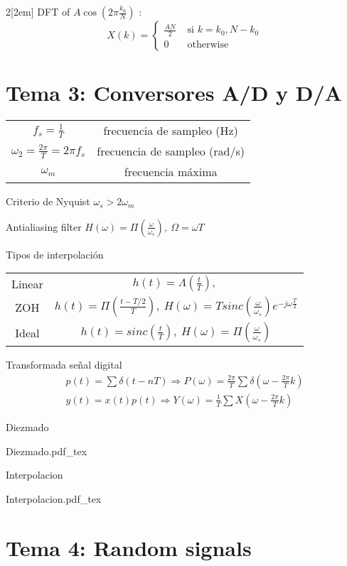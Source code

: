 \documentclass[leqno]{article}
\newcommand{\incfig}[1]{%
{\center
\def\svgwidth{0.9\columnwidth}
{#1.pdf_tex}
\par}
}
\begin{document}
\begin{multicols}{2}[\columnsep2em]
DFT of $A\cos(2\pi \frac{k_0}{N})$ :
\[
  X(k) = 
\begin{cases}
  \frac{AN}{2} &\text{ si } k = k_0, N-k_0 \\
  0 &\text{ otherwise}
\end{cases}
\] 

\section{Tema 3: Conversores A/D y D/A }
\begin{center}
\begin{tabular}{cc}
  $f_s=\frac{1}{T}$ & frecuencia de sampleo (Hz)\\
  $\omega _2 = \frac{2\pi}{T}=2\pi f_s$ & frecuencia de sampleo (rad/s)\\
  $\omega _m$ & frecuencia máxima
\end{tabular}
\end{center}

Criterio de Nyquist $\omega_s>2\omega _m$

Antialiasing filter $H(\omega )=\Pi(\frac{\omega }{\omega _s}), \ \Omega  = \omega T$

Tipos de interpolación
\begin{center}
\begin{tabular}{cc}
  Linear & $h(t)=\Lambda(\frac{t}{T}), \ $ \\
  ZOH & $h(t)=\Pi(\frac{t-T /2}{T}), \ H(\omega ) = Tsinc( \frac{\omega}{\omega _s})e^{-j\omega \frac{T}{2}}$\\
  Ideal & $h(t)=sinc\left(\frac{t}{T}\right), \ H(\omega )=\Pi (\frac{\omega }{\omega _s})$
\end{tabular}
\end{center}

Transformada señal digital
\begin{align*}
  p(t) = \sum \delta(t-nT) \Rightarrow P(\omega ) = \frac{2\pi}{T}\sum \delta (\omega -\frac{2\pi}{T}k) \\
  y(t)=x(t)p(t) \Rightarrow Y(\omega ) = \frac{1}{T}\sum X(\omega -\frac{2\pi}{T}k)
\end{align*}

Diezmado
\incfig{Diezmado}

Interpolacion
\incfig{Interpolacion}

\section{Tema 4: Random signals}


\end{multicols}
\end{document}

